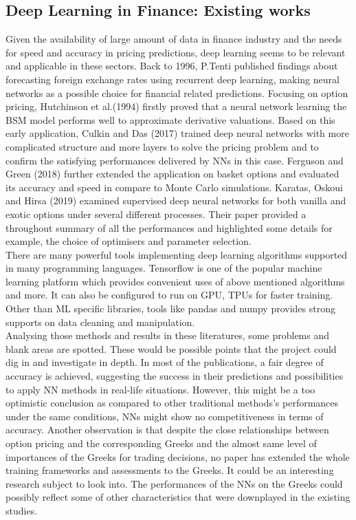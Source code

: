 \documentclass{report}
\begin{document}
\subsection{Deep Learning in Finance: Existing works}
Given the availability of large amount of data in finance industry and the needs for speed and accuracy in pricing predictions, deep learning seems to be relevant and applicable in these sectors. Back to 1996, P.Tenti published findings about forecasting foreign exchange rates using recurrent deep learning, making neural networks as a possible choice for financial related predictions. Focusing on option pricing,  Hutchinson et al.(1994) firstly proved that a neural network learning the BSM model performs well to approximate derivative valuations.
Based on this early application, Culkin and Das (2017) trained deep neural networks with more complicated structure and more layers to solve the pricing problem and to confirm the satisfying performances delivered by NNs in this case. Ferguson and Green (2018) further extended the application on basket options and evaluated its accuracy and speed in compare to Monte Carlo simulations. Karatas, Oskoui and Hirsa (2019) examined supervised deep neural networks for both vanilla and exotic options under several different processes. Their paper provided a throughout summary of all the performances and highlighted some details for example, the choice of optimisers and parameter selection. \\
There are many powerful tools implementing deep learning algorithms supported in many programming languages. Tensorflow is one of the popular machine learning platform which provides convenient uses of above mentioned algorithms and more. It can also be configured to run on GPU, TPUs for faster  training. Other than ML specific libraries, tools like pandas and numpy provides strong supports on data cleaning and manipulation.\\
Analysing those methods and results in these literatures, some problems and blank areas are spotted. These would be possible points that the project could dig in and investigate in depth. In most of the publications,  a fair degree of accuracy is achieved, suggesting the success in their predictions and possibilities to apply NN methods in real-life situations. However, this might be a too optimistic conclusion as compared to other traditional methods's performances under the same conditions, NNs might show no competitiveness in terms of accuracy. 
Another observation is that despite the close relationships between option pricing and the corresponding Greeks and the almost same level of importances of the Greeks for trading decisions, no paper has extended the whole training frameworks and assessments to the Greeks. It could be an interesting research subject to look into. The performances of the NNs on the Greeks could possibly reflect some of other characteristics that were downplayed in the existing studies. 
\end{document}
